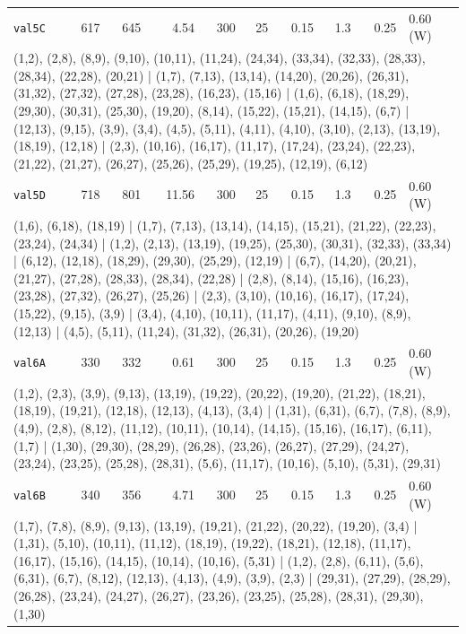 \begin{longtable}{lrrrrrrrrl}
\texttt{val5C} & 617 & 645 & 4.54 & 300 & 25 & 0.15 & 1.3 & 0.25 & 0.60\,(W) \\
\multicolumn{10}{p{0.96\linewidth}}{\tiny\raggedright\arraybackslash (1,2), (2,8), (8,9), (9,10), (10,11), (11,24), (24,34), (33,34), (32,33), (28,33), (28,34), (22,28), (20,21) | (1,7), (7,13), (13,14), (14,20), (20,26), (26,31), (31,32), (27,32), (27,28), (23,28), (16,23), (15,16) | (1,6), (6,18), (18,29), (29,30), (30,31), (25,30), (19,20), (8,14), (15,22), (15,21), (14,15), (6,7) | (12,13), (9,15), (3,9), (3,4), (4,5), (5,11), (4,11), (4,10), (3,10), (2,13), (13,19), (18,19), (12,18) | (2,3), (10,16), (16,17), (11,17), (17,24), (23,24), (22,23), (21,22), (21,27), (26,27), (25,26), (25,29), (19,25), (12,19), (6,12)} \\[2pt]
\texttt{val5D} & 718 & 801 & 11.56 & 300 & 25 & 0.15 & 1.3 & 0.25 & 0.60\,(W) \\
\multicolumn{10}{p{0.96\linewidth}}{\tiny\raggedright\arraybackslash (1,6), (6,18), (18,19) | (1,7), (7,13), (13,14), (14,15), (15,21), (21,22), (22,23), (23,24), (24,34) | (1,2), (2,13), (13,19), (19,25), (25,30), (30,31), (32,33), (33,34) | (6,12), (12,18), (18,29), (29,30), (25,29), (12,19) | (6,7), (14,20), (20,21), (21,27), (27,28), (28,33), (28,34), (22,28) | (2,8), (8,14), (15,16), (16,23), (23,28), (27,32), (26,27), (25,26) | (2,3), (3,10), (10,16), (16,17), (17,24), (15,22), (9,15), (3,9) | (3,4), (4,10), (10,11), (11,17), (4,11), (9,10), (8,9), (12,13) | (4,5), (5,11), (11,24), (31,32), (26,31), (20,26), (19,20)} \\[2pt]
\texttt{val6A} & 330 & 332 & 0.61 & 300 & 25 & 0.15 & 1.3 & 0.25 & 0.60\,(W) \\
\multicolumn{10}{p{0.96\linewidth}}{\tiny\raggedright\arraybackslash (1,2), (2,3), (3,9), (9,13), (13,19), (19,22), (20,22), (19,20), (21,22), (18,21), (18,19), (19,21), (12,18), (12,13), (4,13), (3,4) | (1,31), (6,31), (6,7), (7,8), (8,9), (4,9), (2,8), (8,12), (11,12), (10,11), (10,14), (14,15), (15,16), (16,17), (6,11), (1,7) | (1,30), (29,30), (28,29), (26,28), (23,26), (26,27), (27,29), (24,27), (23,24), (23,25), (25,28), (28,31), (5,6), (11,17), (10,16), (5,10), (5,31), (29,31)} \\[2pt]
\texttt{val6B} & 340 & 356 & 4.71 & 300 & 25 & 0.15 & 1.3 & 0.25 & 0.60\,(W) \\
\multicolumn{10}{p{0.96\linewidth}}{\tiny\raggedright\arraybackslash (1,7), (7,8), (8,9), (9,13), (13,19), (19,21), (21,22), (20,22), (19,20), (3,4) | (1,31), (5,10), (10,11), (11,12), (18,19), (19,22), (18,21), (12,18), (11,17), (16,17), (15,16), (14,15), (10,14), (10,16), (5,31) | (1,2), (2,8), (6,11), (5,6), (6,31), (6,7), (8,12), (12,13), (4,13), (4,9), (3,9), (2,3) | (29,31), (27,29), (28,29), (26,28), (23,24), (24,27), (26,27), (23,26), (23,25), (25,28), (28,31), (29,30), (1,30)} \\[2pt]

\end{longtable}
